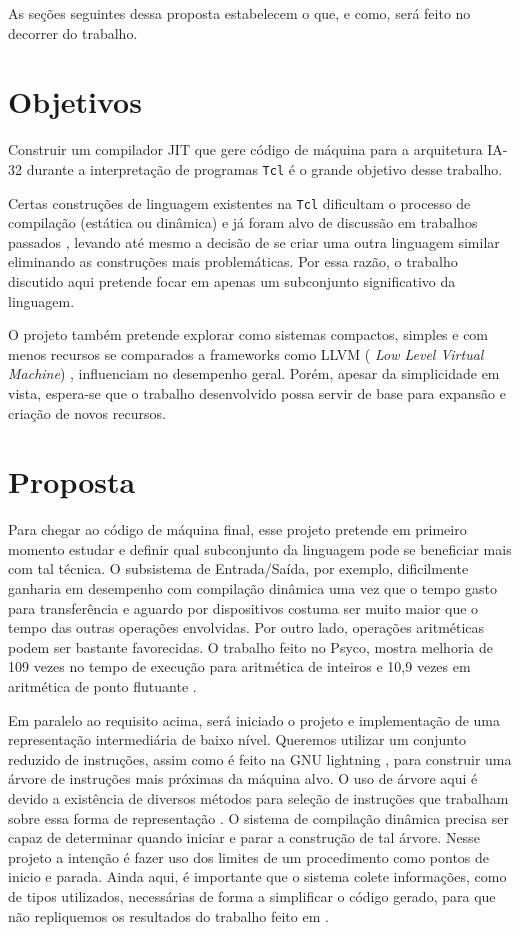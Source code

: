As seções seguintes dessa proposta estabelecem o que, e como, será
feito no decorrer do trabalho.

\section{Objetivos}

Construir um compilador JIT que gere código de máquina para a
arquitetura IA-32 durante a interpretação de programas \texttt{Tcl}
é o grande objetivo desse trabalho.

Certas construções de linguagem existentes na \texttt{Tcl} dificultam
o processo de compilação (estática ou dinâmica) e já foram alvo de
discussão em trabalhos passados \cite{sah_blow} \cite{sah_tc}, levando
até mesmo a decisão de se criar uma outra linguagem similar \cite{rush_lang}
eliminando as construções mais problemáticas. Por essa razão, o
trabalho discutido aqui pretende focar em apenas um subconjunto
significativo da linguagem.

O projeto também pretende explorar como sistemas compactos, simples e com
menos recursos se comparados a frameworks como LLVM (
\textit{Low Level Virtual Machine}) \cite{llvm_2002}, influenciam no desempenho
geral. Porém, apesar da simplicidade em vista, espera-se que o
trabalho desenvolvido possa servir de base para expansão e criação de
novos recursos.


\section{Proposta}

Para chegar ao código de máquina final, esse projeto pretende em
primeiro momento estudar e definir qual subconjunto da linguagem pode
se beneficiar mais com tal técnica. O subsistema de Entrada/Saída, por
exemplo, dificilmente ganharia em desempenho com compilação dinâmica
uma vez que o tempo gasto para transferência e aguardo por dispositivos
costuma ser muito maior que o tempo das outras operações envolvidas.
Por outro lado, operações aritméticas podem ser bastante favorecidas.
O trabalho feito no Psyco, mostra melhoria
de 109 vezes no tempo de execução para aritmética de inteiros e 10,9
vezes em aritmética de ponto flutuante \cite{psyco}.

Em paralelo ao requisito acima, será iniciado o projeto e
implementação de uma representação intermediária de baixo
nível. Queremos utilizar um conjunto reduzido de instruções, assim
como é feito na GNU lightning \cite{gnu_lightning}, para construir uma
árvore de instruções mais próximas da máquina alvo. O uso de
árvore aqui é devido a existência de diversos métodos para seleção de
instruções que trabalham sobre essa forma de representação
\cite{ir_tree_parsing}. O sistema de compilação dinâmica precisa ser
capaz de determinar quando iniciar e parar a construção de tal árvore.
Nesse projeto a intenção é fazer uso dos
limites de um procedimento como pontos de inicio e parada. Ainda aqui,
é importante que o sistema colete informações, como de tipos
utilizados, necessárias de forma a simplificar o código gerado, para
que não repliquemos os resultados do trabalho feito em
\cite{vitale_catenation}.

